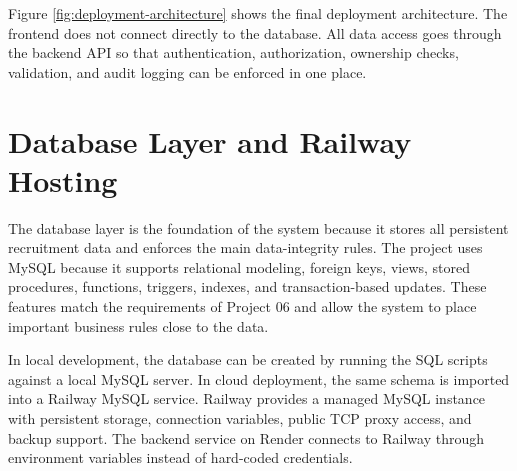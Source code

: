 \documentclass[11pt,a4paper]{report}
\begin{document}
Figure \ref{fig:deployment-architecture} shows the final deployment architecture. The frontend does not connect directly to the database. All data access goes through the backend API so that authentication, authorization, ownership checks, validation, and audit logging can be enforced in one place.

\section{Database Layer and Railway Hosting}

The database layer is the foundation of the system because it stores all persistent recruitment data and enforces the main data-integrity rules. The project uses MySQL because it supports relational modeling, foreign keys, views, stored procedures, functions, triggers, indexes, and transaction-based updates. These features match the requirements of Project 06 and allow the system to place important business rules close to the data.

In local development, the database can be created by running the SQL scripts against a local MySQL server. In cloud deployment, the same schema is imported into a Railway MySQL service. Railway provides a managed MySQL instance with persistent storage, connection variables, public TCP proxy access, and backup support. The backend service on Render connects to Railway through environment variables instead of hard-coded credentials.
\end{document}
